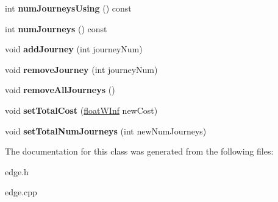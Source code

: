 \begin{DoxyCompactItemize}
\item 
\hypertarget{classedge_ae60713d95940e90e0eb6e0940d33edc5}{
int {\bfseries numJourneysUsing} () const }
\label{classedge_ae60713d95940e90e0eb6e0940d33edc5}

\item 
\hypertarget{classedge_ac5667022774feafe55efa9eb68ba314b}{
int {\bfseries numJourneys} () const }
\label{classedge_ac5667022774feafe55efa9eb68ba314b}

\item 
\hypertarget{classedge_a0af2dc130b7ff513d182cc3365a5e9b9}{
void {\bfseries addJourney} (int journeyNum)}
\label{classedge_a0af2dc130b7ff513d182cc3365a5e9b9}

\item 
\hypertarget{classedge_a6a65d888a62ed5f1b798430c9aed6e44}{
void {\bfseries removeJourney} (int journeyNum)}
\label{classedge_a6a65d888a62ed5f1b798430c9aed6e44}

\item 
\hypertarget{classedge_a44bc7c7bf391f40c3603f21f5f8612b4}{
void {\bfseries removeAllJourneys} ()}
\label{classedge_a44bc7c7bf391f40c3603f21f5f8612b4}

\item 
\hypertarget{classedge_a8a45329dd4f5c94ccdaf0fe30b399766}{
void {\bfseries setTotalCost} (\hyperlink{classfloatWInf}{floatWInf} newCost)}
\label{classedge_a8a45329dd4f5c94ccdaf0fe30b399766}

\item 
\hypertarget{classedge_abf1a83b38b05c53b32e202e3ba0b33ec}{
void {\bfseries setTotalNumJourneys} (int newNumJourneys)}
\label{classedge_abf1a83b38b05c53b32e202e3ba0b33ec}

\end{DoxyCompactItemize}


The documentation for this class was generated from the following files:\begin{DoxyCompactItemize}
\item 
edge.h\item 
edge.cpp\end{DoxyCompactItemize}
